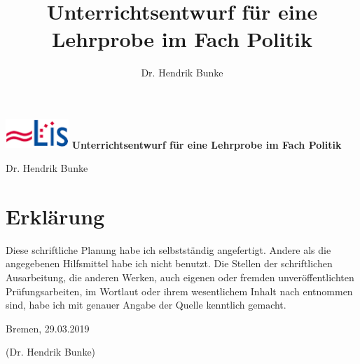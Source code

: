 \documentclass[12pt, a4paper]{scrartcl}
\begin{document}
\title{Unterrichtsentwurf für eine Lehrprobe im Fach Politik}
\author{Dr. Hendrik Bunke}
\date{}
\thispagestyle{empty}

\begin{center}
{\includegraphics[height=1.1cm]{lis.png}}
\singlespacing
{\Huge
    {\textsf
        {\textbf{Unterrichtsentwurf für eine Lehrprobe im Fach Politik}
        }
    }
}

\vspace{0.5cm}
\Large{Dr. Hendrik Bunke}



\end{center}





\footnotesize
\renewcommand{\contentsname}{Gliederung}
\tableofcontents

\newpage
\setcounter{page}{1}
\normalsize













\pagestyle{empty}
\singlespacing



\newpage
\section*{Erklärung}
Diese schriftliche Planung habe ich selbstständig angefertigt. Andere als die
angegebenen Hilfsmittel habe ich nicht benutzt. Die Stellen der schriftlichen
Ausarbeitung, die anderen Werken, auch eigenen oder fremden unveröffentlichten
Prüfungsarbeiten, im Wortlaut oder ihrem wesentlichem Inhalt nach entnommen
sind, habe ich mit genauer Angabe der Quelle kenntlich gemacht.

\vspace{1cm}Bremen, 29.03.2019

\vspace{3cm}(Dr. Hendrik Bunke)







\end{document}
